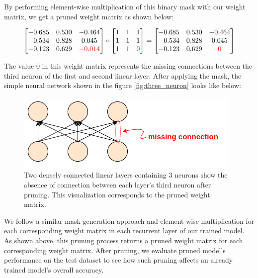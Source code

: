 By performing element-wise multiplication of this binary mask with our weight matrix, we get a pruned weight matrix as shown below:

\[
\begin{bmatrix}
    -0.685 & 0.530 & -0.464 \\
    -0.534 & 0.828 &  0.045 \\
    -0.123 & 0.629 & \textcolor{red}{-0.014}
\end{bmatrix}
\circ
\begin{bmatrix}
    1 & 1 & 1 \\
    1 & 1 &  1 \\
    1 & 1 & \textcolor{red}{0}
\end{bmatrix}
=
\begin{bmatrix}
    -0.685 & 0.530 & -0.464 \\
    -0.534 & 0.828 &  0.045 \\
    -0.123 & 0.629 & \textcolor{red}{0}
\end{bmatrix}
\]

The value $0$ in this weight matrix represents the missing connections between the third neuron of the first and second linear layer. After applying the mask, the simple neural network shown in the figure \ref{fig:three_neuron} looks like below:

\begin{figure}[h]
	\centering
	\includegraphics[width=0.5\linewidth]{images/experiments/pruned_three_neuron.png}
	\caption[Two densely connected linear layers after pruning]%
	{Two densely connected linear layers containing 3 neurons show the absence of connection between each layer's third neuron after pruning. This visualization corresponds to the pruned weight matrix.}
	\label{fig:pruned_three_neuron}
\end{figure}

We follow a similar mask generation approach and element-wise multiplication for each corresponding weight matrix in each recurrent layer of our trained model. As shown above, this pruning process returns a pruned weight matrix for each corresponding weight matrix. After pruning, we evaluate pruned model's performance on the test dataset to see how such pruning affects an already trained model's overall accuracy.

